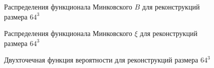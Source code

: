 			\begin{figure}[h]
				\begin{minipage}[h]{0.49\linewidth}
				\end{minipage}
				\hfill
				\begin{minipage}[h]{0.49\linewidth}
				\end{minipage}
				\caption{Распределения функционала Минковского $B$ для реконструкций размера $64^3$}
				\label{5-dist-B-64}
			\end{figure}
		
			\begin{figure}[h]
				\begin{minipage}[h]{0.49\linewidth}
				\end{minipage}
				\hfill
				\begin{minipage}[h]{0.49\linewidth}
				\end{minipage}
				\caption{Распределения функционала Минковского $\xi$ для реконструкций размера $64^3$}
				\label{5-dist-Xi-64}
			\end{figure}
		
			\begin{figure}[h]
				\begin{minipage}[h]{0.49\linewidth}
				\end{minipage}
				\hfill
				\begin{minipage}[h]{0.49\linewidth}
				\end{minipage}
				\caption{Двухточечная функция вероятности для реконструкций размера $64^3$}
				\label{5-prob-64}
			\end{figure}
		
